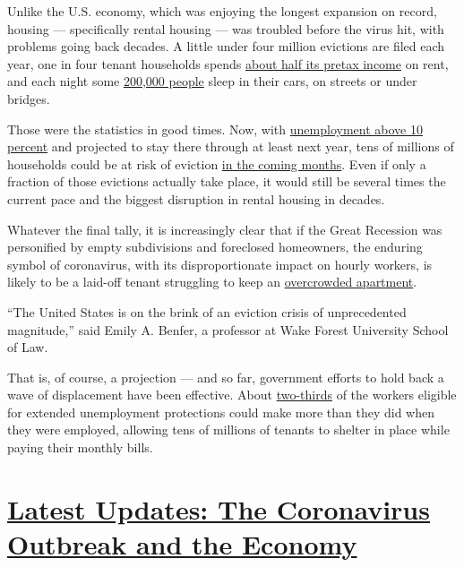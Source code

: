 Unlike the U.S. economy, which was enjoying the longest expansion on
record, housing --- specifically rental housing --- was troubled before
the virus hit, with problems going back decades. A little under four
million evictions are filed each year, one in four tenant households
spends
\href{https://www.jchs.harvard.edu/sites/default/files/Harvard_JCHS_Americas_Rental_Housing_2020.pdf}{about
half its pretax income} on rent, and each night some
\href{https://www.whitehouse.gov/wp-content/uploads/2019/09/The-State-of-Homelessness-in-America.pdf}{200,000
people} sleep in their cars, on streets or under bridges.

Those were the statistics in good times. Now, with
\href{https://www.nytimes3xbfgragh.onion/2020/08/07/world/coronavirus-covid-19.html}{unemployment
above 10 percent} and projected to stay there through at least next
year, tens of millions of households could be at risk of eviction
\href{https://nlihc.org/sites/default/files/The_Eviction_Crisis_080720.pdf}{in
the coming months}. Even if only a fraction of those evictions actually
take place, it would still be several times the current pace and the
biggest disruption in rental housing in decades.

Whatever the final tally, it is increasingly clear that if the Great
Recession was personified by empty subdivisions and foreclosed
homeowners, the enduring symbol of coronavirus, with its
disproportionate impact on hourly workers, is likely to be a laid-off
tenant struggling to keep an
\href{https://www.nytimes3xbfgragh.onion/2020/08/01/business/economy/housing-overcrowding-coronavirus.html}{overcrowded
apartment}.

``The United States is on the brink of an eviction crisis of
unprecedented magnitude,'' said Emily A. Benfer, a professor at Wake
Forest University School of Law.

That is, of course, a projection --- and so far, government efforts to
hold back a wave of displacement have been effective. About
\href{https://bfi.uchicago.edu/working-paper/2020-62/}{two-thirds} of
the workers eligible for extended unemployment protections could make
more than they did when they were employed, allowing tens of millions of
tenants to shelter in place while paying their monthly bills.

\hypertarget{latest-updates-the-coronavirus-outbreak-and-the-economy}{%
\section{\texorpdfstring{\href{https://www.nytimes3xbfgragh.onion/live/2020/08/07/business/stock-market-today-coronavirus?action=click\&pgtype=Article\&state=default\&region=MAIN_CONTENT_1\&context=storylines_live_updates}{Latest
Updates: The Coronavirus Outbreak and the
Economy}}{Latest Updates: The Coronavirus Outbreak and the Economy}}\label{latest-updates-the-coronavirus-outbreak-and-the-economy}}

